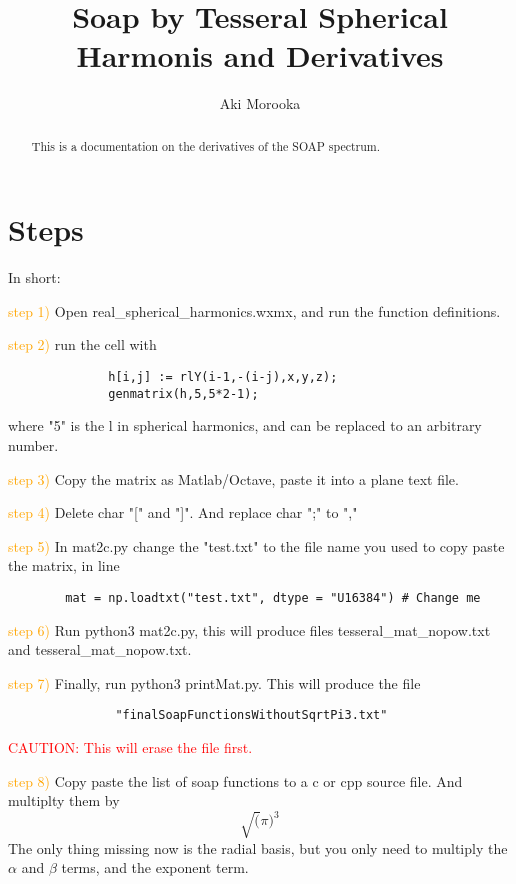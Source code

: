 \documentclass{article}
\begin{document}
\title{Soap by Tesseral Spherical Harmonis and Derivatives}
\author{Aki Morooka}

\maketitle

\begin{abstract}
This is a documentation on the derivatives of the SOAP spectrum.
\end{abstract}

\section*{Steps}
In short: 

\textcolor{orange}{step 1)} Open real\_spherical\_harmonics.wxmx, and run the function definitions.

\textcolor{orange}{step 2)} run the cell with
\begin{verbatim}
              h[i,j] := rlY(i-1,-(i-j),x,y,z);
              genmatrix(h,5,5*2-1);
\end{verbatim}

where "5" is the l in spherical harmonics, and can be replaced to an arbitrary number.

\textcolor{orange}{step 3)} Copy the matrix as Matlab/Octave, paste it into a plane text file.

\textcolor{orange}{step 4)} Delete char "[" and "]". And replace char ";" to ","

\textcolor{orange}{step 5)} In mat2c.py change the "test.txt" to the file name you used to copy paste the matrix, in line

\begin{verbatim}
        mat = np.loadtxt("test.txt", dtype = "U16384") # Change me
\end{verbatim}

\textcolor{orange}{step 6)} Run python3 mat2c.py, this will produce files tesseral\_mat\_nopow.txt and tesseral\_mat\_nopow.txt.

\textcolor{orange}{step 7)} Finally, run  python3 printMat.py. This will produce the file
\begin{verbatim}
               "finalSoapFunctionsWithoutSqrtPi3.txt"
\end{verbatim}

\textcolor{red} {CAUTION: This will erase the file first.}

\textcolor{orange}{step 8)} Copy paste the list of soap functions to a c or cpp source file. And multiplty them by
\begin{equation}
     \sqrt(\pi)^3
\end{equation}
The only thing missing now is the radial basis, but you only need to multiply the $\alpha$ and $\beta$ terms, and the exponent term.
\end{document}
